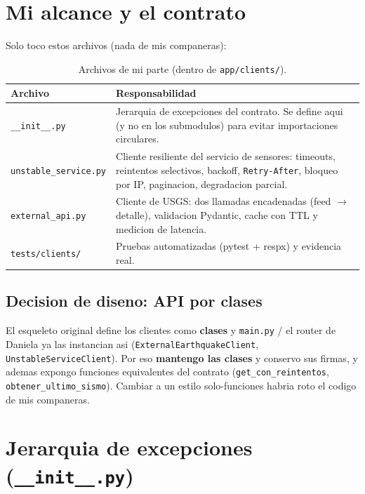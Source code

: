 \documentclass[11pt,a4paper]{article}
\newcommand{\arch}[1]{\texttt{#1}}
\begin{document}
\section{Mi alcance y el contrato}

Solo toco estos archivos (nada de mis companeras):

\begin{table}[H]
\centering
\small
\begin{tabular}{p{4.4cm} p{9.4cm}}
\toprule
\textbf{Archivo} & \textbf{Responsabilidad} \\
\midrule
\arch{\_\_init\_\_.py} &
  Jerarquia de excepciones del contrato. Se define aqui (y no en los
  submodulos) para evitar importaciones circulares. \\
\arch{unstable\_service.py} &
  Cliente resiliente del servicio de sensores: timeouts, reintentos
  selectivos, backoff, \arch{Retry-After}, bloqueo por IP, paginacion,
  degradacion parcial. \\
\arch{external\_api.py} &
  Cliente de USGS: dos llamadas encadenadas (feed $\rightarrow$ detalle),
  validacion Pydantic, cache con TTL y medicion de latencia. \\
\arch{tests/clients/} &
  Pruebas automatizadas (pytest + respx) y evidencia real. \\
\bottomrule
\end{tabular}
\caption{Archivos de mi parte (dentro de \arch{app/clients/}).}
\end{table}

\subsection{Decision de diseno: API por clases}
El esqueleto original define los clientes como \textbf{clases} y
\arch{main.py} / el router de Daniela ya las instancian asi
(\arch{ExternalEarthquakeClient}, \arch{UnstableServiceClient}).
Por eso \textbf{mantengo las clases} y conservo sus firmas, y ademas expongo
funciones equivalentes del contrato (\arch{get\_con\_reintentos},
\arch{obtener\_ultimo\_sismo}). Cambiar a un estilo solo-funciones habria
roto el codigo de mis companeras.

\section{Jerarquia de excepciones (\arch{\_\_init\_\_.py})}
\end{document}
